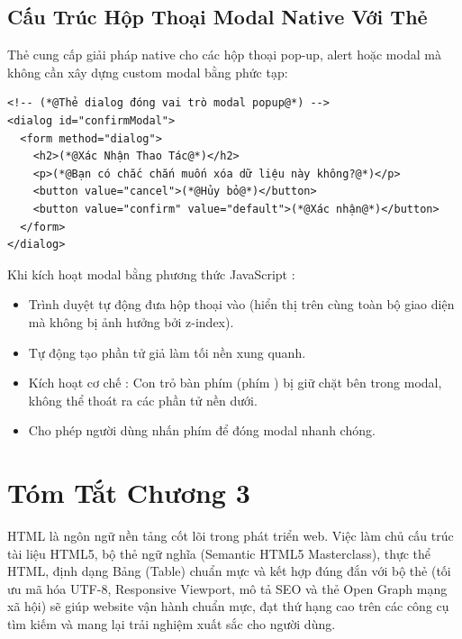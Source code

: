 \Needspace*{120pt}
\subsection{Cấu Trúc Hộp Thoại Modal Native Với Thẻ }

Thẻ  cung cấp giải pháp native cho các hộp thoại pop-up, alert hoặc modal mà không cần xây dựng custom modal bằng  phức tạp:

\begin{codeWindow}
\begin{lstlisting}[language=HTML5]
<!-- (*@Thẻ dialog đóng vai trò modal popup@*) -->
<dialog id="confirmModal">
  <form method="dialog">
    <h2>(*@Xác Nhận Thao Tác@*)</h2>
    <p>(*@Bạn có chắc chắn muốn xóa dữ liệu này không?@*)</p>
    <button value="cancel">(*@Hủy bỏ@*)</button>
    <button value="confirm" value="default">(*@Xác nhận@*)</button>
  </form>
</dialog>
\end{lstlisting}
\end{codeWindow}

\begin{conceptBox}
Khi kích hoạt modal bằng phương thức JavaScript :
\begin{itemize}[leftmargin=1.5em, itemsep=3pt, parsep=0pt]
    \item Trình duyệt tự động đưa hộp thoại vào  (hiển thị trên cùng toàn bộ giao diện mà không bị ảnh hưởng bởi z-index).
    \item Tự động tạo phần tử giả  làm tối nền xung quanh.
    \item Kích hoạt cơ chế : Con trỏ bàn phím (phím ) bị giữ chặt bên trong modal, không thể thoát ra các phần tử nền dưới.
    \item Cho phép người dùng nhấn phím  để đóng modal nhanh chóng.
\end{itemize}
\end{conceptBox}

\Needspace*{80pt}
\section{Tóm Tắt Chương 3}

\begin{noteBox}
HTML là ngôn ngữ nền tảng cốt lõi trong phát triển web. Việc làm chủ cấu trúc tài liệu HTML5, bộ thẻ ngữ nghĩa (Semantic HTML5 Masterclass), thực thể HTML, định dạng Bảng (Table) chuẩn mực và kết hợp đúng đắn với bộ thẻ  (tối ưu mã hóa UTF-8, Responsive Viewport, mô tả SEO và thẻ Open Graph mạng xã hội) sẽ giúp website vận hành chuẩn mực, đạt thứ hạng cao trên các công cụ tìm kiếm và mang lại trải nghiệm xuất sắc cho người dùng.
\end{noteBox}



